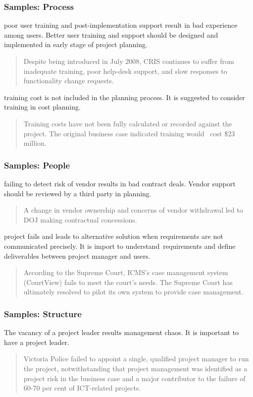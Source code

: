 \subsubsection{Samples: Process}
poor user training and post-implementation support result in bad experience among users. Better user training and support should be designed and implemented in early stage of project planning.

\begin{quotation}
Despite being introduced in July 2008, CRIS continues to suffer from inadequate training, poor help-desk support, and slow responses to functionality change requests.
\end{quotation}

training cost is not included in the planning process. It is suggested to consider training in cost planning.
\begin{quotation}
Training costs have not been fully calculated or recorded against the project. The original business case indicated training would  cost \$23 million.
\end{quotation}

\subsubsection{Samples: People}
failing to detect risk of vendor results in bad contract deals. Vendor support should be reviewed by a third party in planning.
\begin{quotation}
A change in vendor ownership and concerns of vendor withdrawal led to DOJ making contractual concessions.
\end{quotation}

project fails and leads to alternative solution when requirements are not communicated precisely. It is import to understand requirements and define deliverables between project manager and users.
\begin{quotation}
According to the Supreme Court, ICMS’s case management system (CourtView) fails to meet the court’s needs. The Supreme Court has ultimately resolved to pilot its own system to provide case management.
\end{quotation}

\subsubsection{Samples: Structure}
The vacancy of a project leader results management chaos. It is important to have a project leader.
\begin{quotation}
Victoria Police failed to appoint a single, qualified project manager to run the project, notwithstanding that project management was identified as a project risk in the business case and a major contributor to the failure of 60-70 per cent of ICT-related projects.
\end{quotation}

